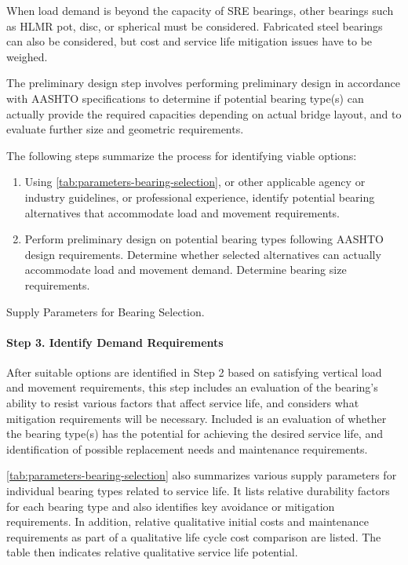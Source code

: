 When load demand is beyond the capacity of SRE bearings, other bearings such as HLMR pot, disc, or
spherical must be considered. Fabricated steel bearings can also be considered, but cost and service life
mitigation issues have to be weighed.

The preliminary design step involves performing preliminary design in accordance with AASHTO
specifications to determine if potential bearing type(s) can actually provide the required capacities depending on
actual bridge layout, and to evaluate further size and geometric requirements.

The following steps summarize the process for identifying viable options:
\begin{enumerate}[label=步骤 2.\arabic*,itemindent=4em]
  \item Using \cref{tab:parameters-bearing-selection}, or other applicable agency or industry guidelines, or professional experience, identify potential bearing alternatives that accommodate load and movement requirements.
  \item Perform preliminary design on potential bearing types following AASHTO design requirements. Determine whether selected alternatives can actually accommodate load and movement demand. Determine bearing size requirements.
\end{enumerate}

\begin{table}
  \caption{Supply Parameters for Bearing Selection.}
  \label{tab:parameters-bearing-selection}
\end{table}

\paragraph*{Step 3. Identify Demand Requirements}
After suitable options are identified in Step 2 based on satisfying vertical load and movement requirements, this step includes an evaluation of the bearing’s ability to resist various factors that affect service life, and considers what mitigation requirements will be necessary. Included is an evaluation of whether the bearing type(s) has the potential for achieving the desired service life, and identification of possible replacement needs and maintenance requirements.

\cref{tab:parameters-bearing-selection} also summarizes various supply parameters for individual bearing types related to service life. It lists relative durability factors for each bearing type and also identifies key avoidance or mitigation requirements. In addition, relative qualitative initial costs and maintenance requirements as part of a qualitative life cycle cost comparison are listed. The table then indicates relative qualitative service life potential.

